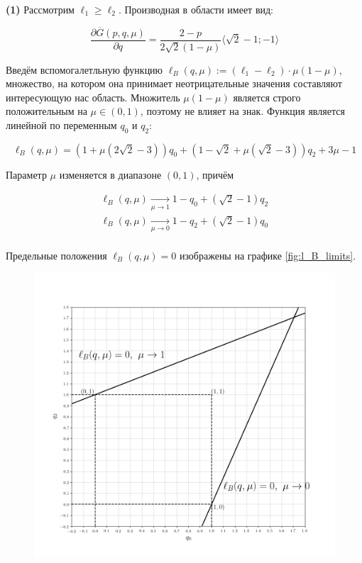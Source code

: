 \begin{flushleft}

	\textbf{(1)} Рассмотрим $\ell_1 \geqslant \ell_2$. 
	Производная в области имеет вид:
	
	$$\frac{\partial \overline{G}(p,q,\mu)}{\partial q}=
	\frac{2-p}{2\sqrt{2}(1-\mu)} \langle \sqrt{2}-1; -1 \rangle$$
 	
	Введём вспомогалетльную функцию	
 	$\ell_B(q, \mu):=(\ell_1-\ell_2) \cdot \mu(1-\mu)$,
 	множество, на котором она принимает неотрицательные значения 
 	составляют интересующую нас область. Множитель $\mu(1-\mu)$ является строго
 	положительным на $\mu \in (0,1)$, поэтому не влияет на знак. Функция
 	является линейной по переменным $q_0$ и $q_2$:
 	
	$$\ell_B(q, \mu) = 
	(1+\mu(2\sqrt{2}-3))q_0+
	(1-\sqrt{2}+\mu(\sqrt{2}-3))q_2
	+3\mu-1$$ 	
	
	Параметр $\mu$ изменяется в диапазоне $(0,1)$, причём	
	
	\begin{gather*}	
	\ell_B(q,\mu) \xrightarrow[\mu\rightarrow 1]{} 
	1-q_0+(\sqrt{2}-1)q_2\\	
	\ell_B(q,\mu) \xrightarrow[\mu\rightarrow 0]{} 	
	1-q_2+(\sqrt{2}-1)q_0\\
	\end{gather*}
	
	Предельные положения $\ell_B(q, \mu)=0$ изображены на графике \eqref{fig:l_B_limits}.
	
	\begin{figure}[H]
		\centering
  		\includegraphics[scale=0.3]{images/graf_3_2}
  		\caption{}
  		\label{fig:l_B_limits}
	\end{figure}	
	

\end{flushleft}
